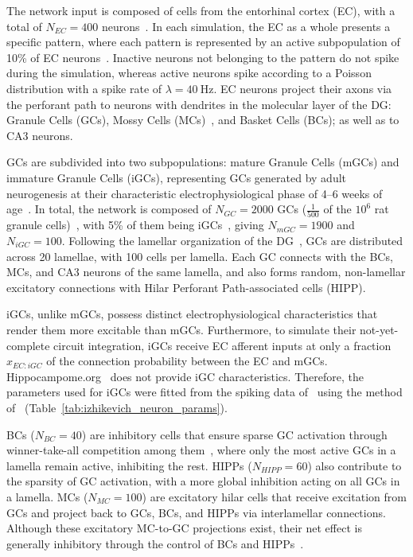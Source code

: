 The network input is composed of cells from the entorhinal cortex (EC), with a total of $N_{EC} = 400$
neurons~\parencite{amaralChapter1990, kimAdult2024}. In each simulation, the EC as a whole presents a specific pattern, where each
pattern is represented by an active subpopulation of 10\% of EC neurons~\parencite{mcnaughtonDead1991}. Inactive neurons not
belonging to the pattern do not spike during the simulation, whereas active neurons spike according to a Poisson distribution
with a spike rate of $\lambda = \SI{40}{\hertz}$. EC neurons project their axons via the perforant path to neurons with
dendrites in the molecular layer of the DG: Granule Cells (GCs), Mossy Cells (MCs)~\parencite{scharfmanHilar2013}, and Basket
Cells (BCs); as well as to CA3 neurons.

GCs are subdivided into two subpopulations: mature Granule Cells (mGCs) and immature Granule Cells (iGCs), representing GCs
generated by adult neurogenesis at their characteristic electrophysiological phase of 4--6 weeks of age~\parencite{aimoneRegulation2014}.
In total, the network is composed of $N_{GC} = 2000$ GCs ($\frac{1}{500}$ of the $10^6$ rat granule cells)~\parencite{westUnbiased1991},
with 5\% of them being iGCs~\parencite{cameronAdult2001}, giving $N_{mGC} = 1900$ and $N_{iGC} = 100$. Following the lamellar
organization of the DG~\parencite{sloviterUpdating2012}, GCs are distributed across 20 lamellae, with 100 cells per lamella. Each GC
connects with the BCs, MCs, and CA3 neurons of the same lamella, and also forms random, non-lamellar excitatory connections with
Hilar Perforant Path-associated cells (HIPP).

iGCs, unlike mGCs, possess distinct electrophysiological characteristics that render them more excitable than mGCs. Furthermore,
to simulate their not-yet-complete circuit integration, iGCs receive EC afferent inputs at only a fraction $x_{EC:iGC}$ of the
connection probability between the EC and mGCs. Hippocampome.org~\parencite{wheelerHippocampomeorg2023} does not provide iGC
characteristics. Therefore, the parameters used for iGCs were fitted from the spiking data
of~\textcite{espositoNeuronal2005} using the method of~\textcite{nelderSimplex1965}
(Table~\ref{tab:izhikevich_neuron_params}).

BCs ($N_{BC} = 40$) are inhibitory cells that ensure sparse GC activation through winner-take-all competition among
them~\parencite{coultripCortical1992, chavlisDendrites2017, kimAdult2024}, where only the most active GCs in a lamella remain active,
inhibiting the rest. HIPPs ($N_{HIPP} = 60$) also contribute to the sparsity of GC activation, with a more global inhibition
acting on all GCs in a lamella. MCs ($N_{MC} = 100$) are excitatory hilar cells that receive excitation from GCs and project
back to GCs, BCs, and HIPPs via interlamellar connections. Although these excitatory MC-to-GC projections exist, their net
effect is generally inhibitory through the control of BCs and HIPPs~\parencite{myersRole2009, scharfmanHilar2013}.

